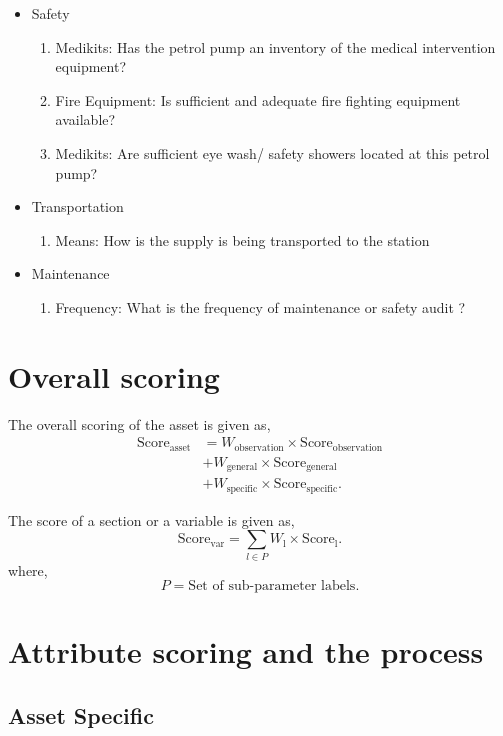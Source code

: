\documentclass[oneside,twocolumn]{article}
\newcommand{\tsub}[2]{\text{#1}_{\text{#2}}}
\newcommand{\tsubb}[2]{#1_{\text{#2}}}
\begin{document}
\begin{itemize}
\begin{itemize}
\item Safety
\begin{enumerate}
\item Medikits: Has the petrol pump an inventory of the medical intervention equipment?
\item Fire Equipment: Is sufficient and adequate fire fighting equipment available?
\item Medikits: Are sufficient eye wash/ safety showers located at this petrol pump?
\end{enumerate}

\item Transportation
\begin{enumerate}
\item Means: How is the supply is being transported to the station
\end{enumerate}

\item Maintenance
\begin{enumerate}
\item Frequency: What is the frequency of  maintenance or safety audit ?
\end{enumerate}

\end{itemize}

    \end{itemize}
\section{Overall scoring}
The overall scoring of the asset is given as,
\begin{align*}
	\tsub{Score}{asset} &= \tsubb{W}{observation} \times \tsub{Score}{observation} \\
	&+ \tsubb{W}{general} \times \tsub{Score}{general} \\
	&+ \tsubb{W}{specific} \times \tsub{Score}{specific}.
\end{align*}

The score of a section or a variable is given as,
\[
	\tsub{Score}{var} = \sum_{l \in P} \tsubb{W}{l} \times \tsub{Score}{l}.
\]
where,
\[
	P = \text{Set of sub-parameter labels.}
\]
\section{Attribute scoring and the
process}
\subsection{Asset Specific}
\end{document}
